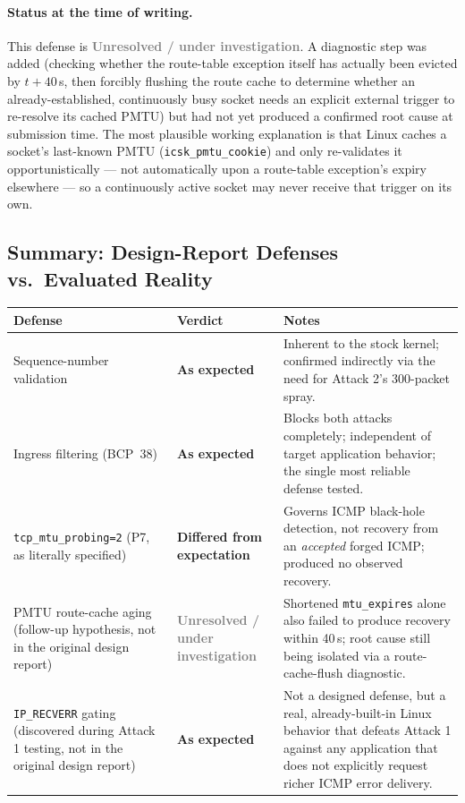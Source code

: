 \documentclass[11pt]{article}
\newcommand{\worked}{\textcolor{green!50!black}{\textbf{As expected}}}
\newcommand{\failed}{\textcolor{red!70!black}{\textbf{Differed from expectation}}}
\newcommand{\open}{\textcolor{gray}{\textbf{Unresolved / under investigation}}}
\begin{document}
\paragraph{Status at the time of writing.} This defense is
\open. A diagnostic step was added (checking whether the route-table
exception itself has actually been evicted by $t{+}40$\,s, then forcibly
flushing the route cache to determine whether an already-established,
continuously busy socket needs an explicit external trigger to
re-resolve its cached PMTU) but had not yet produced a confirmed root
cause at submission time. The most plausible working explanation is
that Linux caches a socket's last-known PMTU
(\texttt{icsk\_pmtu\_cookie}) and only re-validates it opportunistically
--- not automatically upon a route-table exception's expiry elsewhere
--- so a continuously active socket may never receive that trigger on
its own.

\subsection{Summary: Design-Report Defenses vs.\ Evaluated Reality}

\begin{center}
\begin{longtable}{@{}p{4.2cm}p{2.6cm}p{7.5cm}@{}}
\toprule
\textbf{Defense} & \textbf{Verdict} & \textbf{Notes} \\
\midrule
\endhead
Sequence-number validation & \worked & Inherent to the stock kernel; confirmed indirectly via the need for Attack 2's 300-packet spray. \\
Ingress filtering (BCP~38) & \worked & Blocks both attacks completely; independent of target application behavior; the single most reliable defense tested. \\
\texttt{tcp\_mtu\_probing=2} (P7, as literally specified) & \failed & Governs ICMP black-hole detection, not recovery from an \emph{accepted} forged ICMP; produced no observed recovery. \\
PMTU route-cache aging (follow-up hypothesis, not in the original design report) & \open & Shortened \texttt{mtu\_expires} alone also failed to produce recovery within 40\,s; root cause still being isolated via a route-cache-flush diagnostic. \\
\texttt{IP\_RECVERR} gating (discovered during Attack 1 testing, not in the original design report) & \worked & Not a designed defense, but a real, already-built-in Linux behavior that defeats Attack 1 against any application that does not explicitly request richer ICMP error delivery. \\
\bottomrule
\end{longtable}
\end{center}
\end{document}
